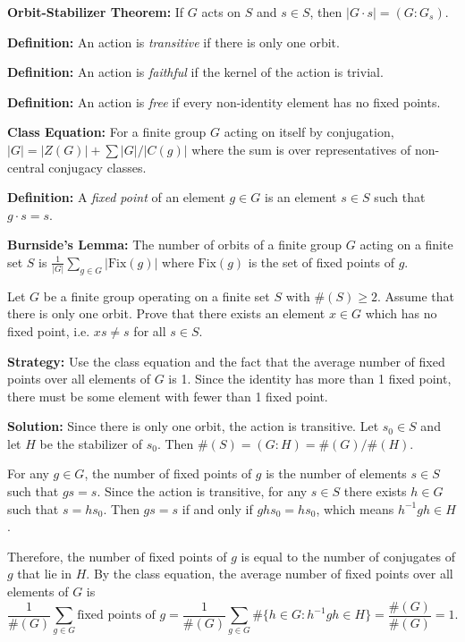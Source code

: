 \textbf{Orbit-Stabilizer Theorem:} If $G$ acts on $S$ and $s \in S$, then $|G \cdot s| = (G : G_s)$.

\textbf{Definition:} An action is \textit{transitive} if there is only one orbit.

\textbf{Definition:} An action is \textit{faithful} if the kernel of the action is trivial.

\textbf{Definition:} An action is \textit{free} if every non-identity element has no fixed points.

\textbf{Class Equation:} For a finite group $G$ acting on itself by conjugation, $|G| = |Z(G)| + \sum |G|/|C(g)|$ where the sum is over representatives of non-central conjugacy classes.

\textbf{Definition:} A \textit{fixed point} of an element $g \in G$ is an element $s \in S$ such that $g \cdot s = s$.

\textbf{Burnside's Lemma:} The number of orbits of a finite group $G$ acting on a finite set $S$ is $\frac{1}{|G|} \sum_{g \in G} |\text{Fix}(g)|$ where $\text{Fix}(g)$ is the set of fixed points of $g$.

\begin{problembox}
Let $G$ be a finite group operating on a finite set $S$ with $\#(S) \geq 2$. Assume that there is only one orbit. Prove that there exists an element $x \in G$ which has no fixed point, i.e. $xs \neq s$ for all $s \in S$.
\end{problembox}

\noindent\textbf{Strategy:} Use the class equation and the fact that the average number of fixed points over all elements of $G$ is 1. Since the identity has more than 1 fixed point, there must be some element with fewer than 1 fixed point.

\noindent\textbf{Solution:} Since there is only one orbit, the action is transitive. Let $s_0 \in S$ and let $H$ be the stabilizer of $s_0$. Then $\#(S) = (G : H) = \#(G)/\#(H)$.

For any $g \in G$, the number of fixed points of $g$ is the number of elements $s \in S$ such that $gs = s$. Since the action is transitive, for any $s \in S$ there exists $h \in G$ such that $s = hs_0$. Then $gs = s$ if and only if $ghs_0 = hs_0$, which means $h^{-1}gh \in H$.

Therefore, the number of fixed points of $g$ is equal to the number of conjugates of $g$ that lie in $H$. By the class equation, the average number of fixed points over all elements of $G$ is
\[\frac{1}{\#(G)} \sum_{g \in G} \text{fixed points of } g = \frac{1}{\#(G)} \sum_{g \in G} \#\{h \in G : h^{-1}gh \in H\} = \frac{\#(G)}{\#(G)} = 1.\]


